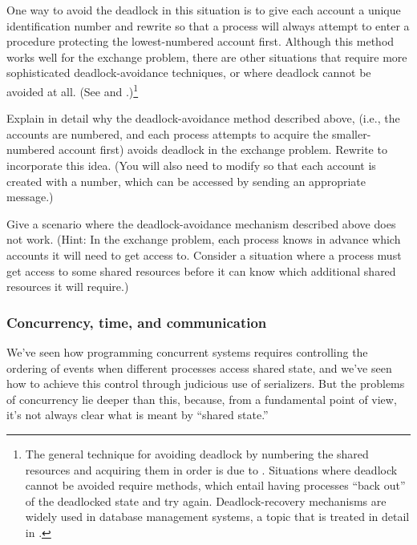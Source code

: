 One way to avoid the deadlock in this situation is to give each account a
unique identification number and rewrite  so that a
process will always attempt to enter a procedure protecting the lowest-numbered
account first.  Although this method works well for the exchange problem, there
are other situations that require more sophisticated deadlock-avoidance
techniques, or where deadlock cannot be avoided at all.  (See 
and .)\footnote{The general technique for avoiding
deadlock by numbering the shared resources and acquiring them in order is due
to .  Situations where deadlock cannot be avoided require
 methods, which entail having processes ``back out''
of the deadlocked state and try again.  Deadlock-recovery mechanisms are widely
used in database management systems, a topic that is treated in detail in
.}

\begin{exerciseGroup}
\label{Exercise 3.48}
 Explain in detail why the
deadlock-avoidance method described above, (i.e., the accounts are numbered,
and each process attempts to acquire the smaller-numbered account first) avoids
deadlock in the exchange problem.  Re\-write  to
incorporate this idea.  (You will also need to modify  so
that each account is created with a number, which can be accessed by sending an
appropriate message.)

\label{Exercise 3.49}
 Give a scenario where the
deadlock-avoid\-ance mechanism described above does not work.  (Hint: In the
exchange problem, each process knows in advance which accounts it will need to
get access to.  Consider a situation where a process must get access to some
shared resources before it can know which additional shared resources it will
require.)
\end{exerciseGroup}

\subsubsection*{Concurrency, time, and communication}

We've seen how programming concurrent systems requires controlling the ordering
of events when different processes access shared state, and we've seen how to
achieve this control through judicious use of serializers.  But the problems of
concurrency lie deeper than this, because, from a fundamental point of view,
it's not always clear what is meant by ``shared state.''

